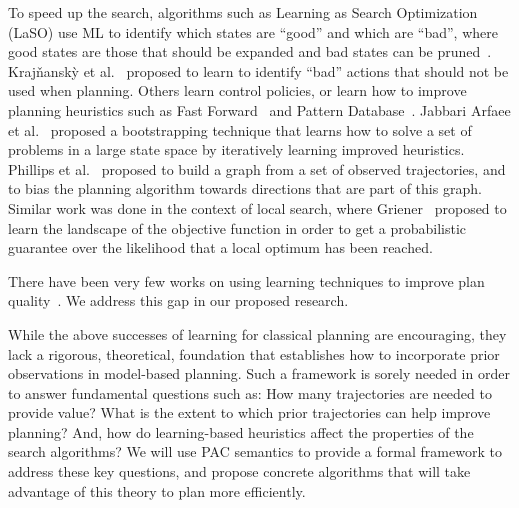 \documentclass[12pt]{article}
\begin{document}
To speed up the search, algorithms such as Learning as Search Optimization (LaSO) use ML to identify which states are ``good'' and which are ``bad'', where good states are those that should be expanded and bad states can be pruned~\cite{xu2007discriminative}. %
Kraj{\v{n}}ansk{\`y} et al.~\cite{krajvnansky2014learning} proposed to learn to identify ``bad'' actions that should not be used when planning. 
Others learn control policies, or learn how to improve planning heuristics such as Fast Forward~\cite{yoon2008learning} and Pattern Database~\cite{samadi2008learning}. Jabbari Arfaee et al.~\cite{arfaee2011learning} proposed a bootstrapping technique that learns how to solve a set of problems in a large state space by iteratively learning improved heuristics. 
Phillips et al.~\cite{phillips2012graphs} proposed to build a graph from a set of observed trajectories, and to bias the planning algorithm towards directions that are part of this graph. Similar work was done in the context of local search, 
where Griener~\cite{greiner1996palo} proposed to learn
the landscape of the objective function in order to get a probabilistic guarantee over the likelihood that a local optimum has been reached. 

 There have been very few works on using learning techniques to improve plan quality~\cite{zimmerman2003learning}. We address this gap in our proposed research. %



While the above successes of learning for classical planning are encouraging, they lack a rigorous, theoretical, foundation that establishes how to incorporate prior observations in model-based planning. Such a framework is sorely needed in order to answer fundamental questions such as: How many trajectories are needed to provide value? What is the extent to which prior trajectories can help improve planning? And, how do learning-based heuristics affect the properties of the search algorithms? We will use PAC semantics  to provide a formal framework to address these key questions, and propose concrete algorithms that will take advantage of this theory to plan more efficiently. 
\end{document}
